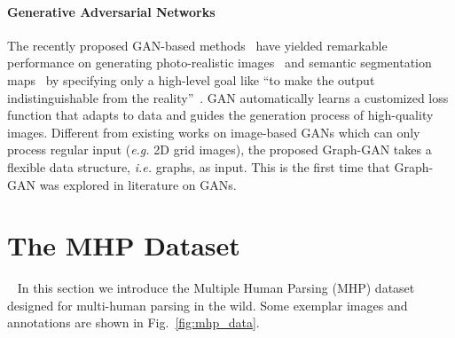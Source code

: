 \documentclass[10pt, letterpaper]{article}
\begin{document}
\paragraph{Generative Adversarial Networks}
The recently proposed GAN-based methods~\cite{goodfellow2014generative,radford2015unsupervised,arjovsky2017wasserstein} have yielded remarkable performance on generating photo-realistic images~\cite{huang2017beyond} and semantic segmentation maps~\cite{luc2016semantic} by specifying only a high-level goal like ``to make the output indistinguishable from the reality''~\cite{isola2016image}.  GAN automatically learns a customized loss function that  adapts to data and guides the generation process of high-quality images. Different from existing works on  image-based GANs which can only process regular input (\emph{e.g.} 2D grid images), the proposed Graph-GAN takes a flexible data structure, \emph{i.e.} graphs, as input. This is the first time that Graph-GAN was  explored in literature on GANs. 


\section{The MHP Dataset}
~\label{sec:mhp_data}
In this section we introduce the Multiple Human Parsing (MHP) dataset designed for multi-human parsing in the wild. Some exemplar images  and annotations are shown in Fig.~\ref{fig:mhp_data}. 
\end{document}
